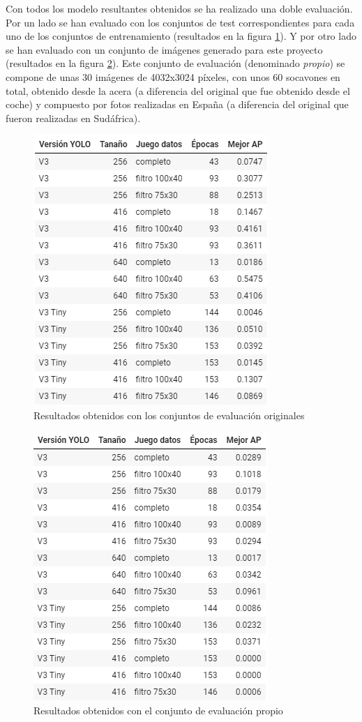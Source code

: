 Con todos los modelo resultantes obtenidos se ha realizado una doble evaluación. Por un lado se han evaluado con los conjuntos de test correspondientes para cada uno de los conjuntos de entrenamiento (resultados en la figura \ref{fig:evaluationoriginal}). Y por otro lado se han evaluado con un conjunto de imágenes generado para este proyecto (resultados en la figura \ref{fig:evaluationcustom}). Este conjunto de evaluación (denominado \textit{propio}) se compone de unas 30 imágenes de 4032x3024 píxeles, con unos 60 socavones en total, obtenido desde la acera (a diferencia del original que fue obtenido desde el coche) y compuesto por fotos realizadas en España (a diferencia del original que fueron realizadas en Sudáfrica).

\begin{figure}[H]
	\centering
	\includegraphics[width=0.6\linewidth]{images/evaluation_original.png}
	\caption{Resultados obtenidos con los conjuntos de evaluación originales}
	\label{fig:evaluationoriginal}
\end{figure}

\begin{figure}[H]
	\centering
	\includegraphics[width=0.6\linewidth]{images/evaluation_custom.png}
	\caption{Resultados obtenidos con el conjunto de evaluación propio}
	\label{fig:evaluationcustom}
\end{figure}
